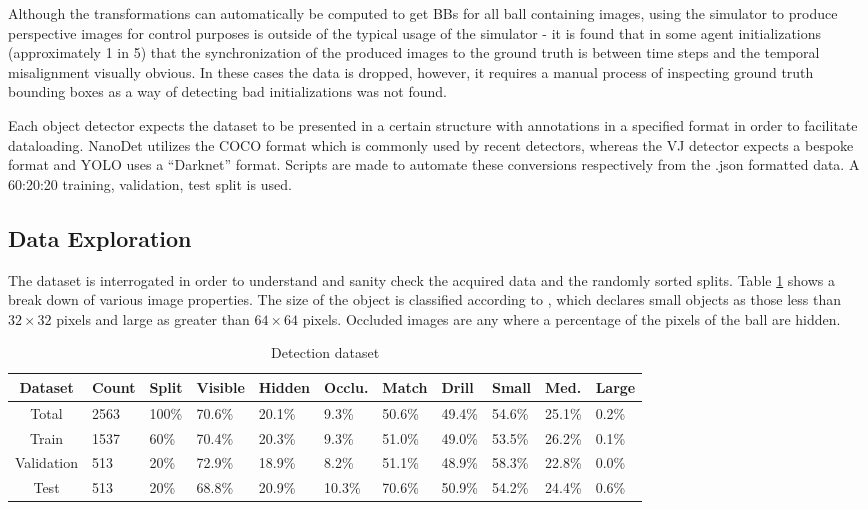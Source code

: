 \documentclass[a4paper,twoside,12pt]{report}
\begin{document}
Although the transformations can automatically be computed to get BBs for all ball containing images, using the simulator to produce perspective images for control purposes is outside of the typical usage of the simulator - it is found that in some agent initializations (approximately 1 in 5) that the synchronization of the produced images to the ground truth is between time steps and the temporal misalignment visually obvious. In these cases the data is dropped, however, it requires a manual process of inspecting ground truth bounding boxes as a way of detecting bad initializations was not found.

Each object detector expects the dataset to be presented in a certain structure with annotations in a specified format in order to facilitate dataloading. NanoDet utilizes the COCO format \citep{cocodataset} which is commonly used by recent detectors, whereas the VJ detector expects a bespoke format \citep{vjdataset} and YOLO uses a ``Darknet'' format. Scripts are made to automate these conversions respectively from the .json formatted data. A 60:20:20 training, validation, test split is used.

\subsection{Data Exploration}
The dataset is interrogated in order to understand and sanity check the acquired data and the randomly sorted splits. Table \ref{tab:detection} shows a break down of various image properties. The size of the object is classified according to \cite{cocoeval}, which declares small objects as those less than $32\times32$ pixels and large as greater than $64\times64$ pixels. Occluded images are any where a percentage of the pixels of the ball are hidden.

\begin{table}[h!]
\fontsize{9.5pt}{12pt}\selectfont
\centering
\begin{tabular}{c|ll|lll|ll|lll}
{\bf Dataset}	&{\bf Count}	&{\bf Split}	&{\bf Visible}	&{\bf Hidden}	&{\bf Occlu.}	&{\bf Match}	&{\bf Drill}	&{\bf Small}	&{\bf Med.}	&{\bf Large}	\\\hline
Total			&2563			&100\%			&70.6\%			&20.1\%			&9.3\%			&50.6\%			&49.4\%			&54.6\%			&25.1\%			&0.2\%			\\\hline   
Train			&1537			&60\%			&70.4\%			&20.3\%			&9.3\%			&51.0\%			&49.0\%			&53.5\%			&26.2\%			&0.1\%			\\\hline  
Validation		&513			&20\%			&72.9\%			&18.9\%			&8.2\%			&51.1\%			&48.9\%			&58.3\%			&22.8\%			&0.0\%			\\\hline  
Test			&513			&20\%			&68.8\%			&20.9\%			&10.3\%			&70.6\%			&50.9\%			&54.2\%			&24.4\%			&0.6\%			\\\hline                        
\end{tabular}
\caption{Detection dataset}
\label{tab:detection}
\end{table}
\end{document}
